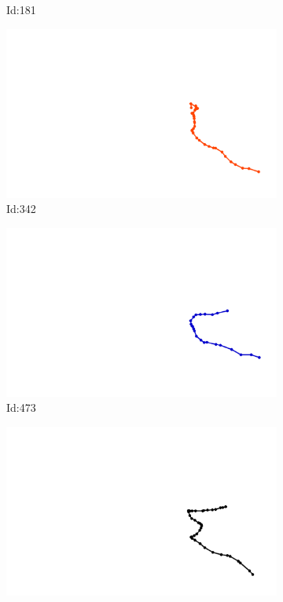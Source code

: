 \documentclass[12pt,twoside]{report}
\begin{document}
\begin{figure}
\begin{subfigure}[b]{0.20\textwidth}
\caption{Id:181}
\end{subfigure}
\begin{subfigure}[b]{0.20\textwidth}
\centering
\includegraphics[width=\textwidth]{../../trajectories/342.png}
\caption{Id:342}
\end{subfigure}
\begin{subfigure}[b]{0.20\textwidth}
\centering
\includegraphics[width=\textwidth]{../../trajectories/473.png}
\caption{Id:473}
\end{subfigure}
\begin{subfigure}[b]{0.20\textwidth}
\centering
\includegraphics[width=\textwidth]{../../trajectories/549.png}

\end{subfigure}
\end{figure}
\end{document}
